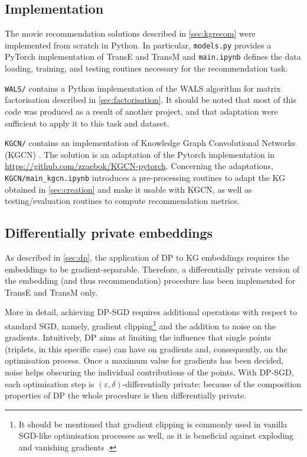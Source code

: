 \subsection{Implementation}\label{sec:implementation}

The movie recommendation solutions described in \cref{sec:kgrecom} were implemented  from scratch in Python.
In particular, \texttt{models.py} provides a PyTorch implementation of TransE and TransM and \texttt{main.ipynb} defines the data loading, training, and testing routines necessary for the recommendation task.

\texttt{WALS/} contains a Python implementation of the WALS algorithm for matrix factorisation described in \cref{sec:factorisation}.
It should be noted that most of this code was produced as a result of another project, and that adaptation were sufficient to apply it to this task and dataset.

\texttt{KGCN/}  contains an implementation of Knowledge Graph Convolutional Networks (KGCN) \parencite{wang2019knowledge}.
The solution is an adaptation of the Pytorch implementation in \url{https://github.com/zzaebok/KGCN-pytorch}.
Concerning the adaptations, \texttt{KGCN/main\_kgcn.ipynb} introduces a pre-processing routines to adapt the KG obtained in \cref{sec:creation} and make it usable with KGCN, as well as testing/evaluation routines to compute recommendation metrics.



\subsection{Differentially private embeddings}

As described in \cref{sec:dp}, the application of DP to KG embeddings requires the embeddings to be gradient-separable.
Therefore, a differentially private version of the embedding (and thus recommendation) procedure has been implemented for TransE and TransM only.

More in detail, achieving DP-SGD requires additional operations with respect to standard SGD, namely, gradient clipping\footnote{It should be mentioned that gradient clipping is commonly used in vanilla SGD-like optimisation processes as well, as it is beneficial against exploding and vanishing gradients \parencite{pascanu2013difficulty}.} and the addition to noise on the gradients.
Intuitively, DP aims at limiting the influence that single points (triplets, in this specific case) can have on gradients and, consequently, on the optimisation process.
Once a maximum value for gradients has been decided, noise helps obscuring the individual contributions of the points.
With DP-SGD, each optimisation step is $(\varepsilon, \delta)$-differentially private: because of the composition properties of DP \parencite{dwork2014algorithmic} the whole procedure is then differentially private.


